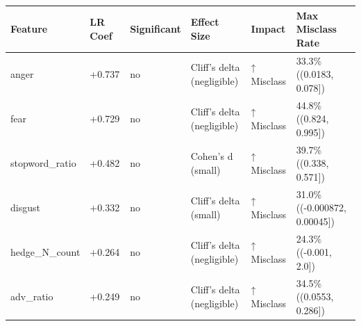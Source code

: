 \begin{tabular}{llllll}
\toprule
Feature & LR Coef & Significant & Effect Size & Impact & Max Misclass Rate \\
\midrule
anger & +0.737 & no & Cliff's delta (negligible) & ↑ Misclass & 33.3\% ((0.0183, 0.078]) \\
fear & +0.729 & no & Cliff's delta (negligible) & ↑ Misclass & 44.8\% ((0.824, 0.995]) \\
stopword\_ratio & +0.482 & no & Cohen's d (small) & ↑ Misclass & 39.7\% ((0.338, 0.571]) \\
disgust & +0.332 & no & Cliff's delta (small) & ↑ Misclass & 31.0\% ((-0.000872, 0.00045]) \\
hedge\_N\_count & +0.264 & no & Cliff's delta (negligible) & ↑ Misclass & 24.3\% ((-0.001, 2.0]) \\
adv\_ratio & +0.249 & no & Cliff's delta (negligible) & ↑ Misclass & 34.5\% ((0.0553, 0.286]) \\
\bottomrule
\end{tabular}
